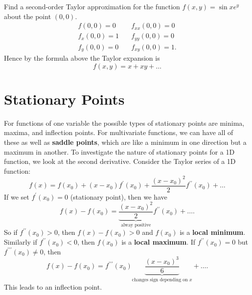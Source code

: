 \documentclass[../multivariate_calculus.tex]{subfiles}
\begin{document}
        \begin{example}
            Find a second-order Taylor approximation for the function $f(x,y)=\sin xe^y$ about the point $(0,0)$.
            \begin{align}
                f(0,0)=0&\quad f_{xx}(0,0)=0\\
                f_x(0,0)=1&\quad f_{yy}(0,0)=0\\
                f_y(0,0)=0&\quad f_{xy}(0,0)=1.
            \end{align}
            Hence by the formula above the Taylor expansion is
            \begin{equation}
                f(x,y)=x+xy+\dots
            \end{equation}
        \end{example}

    \section{Stationary Points}
        \paragraph{}
        For functions of one variable the possible types of stationary points are minima, maxima, and inflection points.
        For multivariate functions, we can have all of these as well as \textbf{saddle points}, which are like a minimum in one direction but a maximum in another.
        To investigate the nature of stationary points for a 1D function, we look at the second derivative.
        Consider the Taylor series of a 1D function:
        \begin{equation}
            f(x)=f(x_0)+(x-x_0)f^\prime(x_0)+\frac{(x-x_0)^2}{2}f^{\prime\prime}(x_0)+\dots
        \end{equation}
        If we set $f^\prime(x_0)=0$ (stationary point), then we have
        \begin{equation}
            f(x)-f(x_0)=\underbrace{\frac{(x-x_0)^2}{2}}_\text{alway positive}f^{\prime\prime}(x_0)+\dots.
        \end{equation}
        So if $f^{\prime\prime}(x_0)>0$, then $f(x)-f(x_0)>0$ and $f(x_0)$ is a \textbf{local minimum}.
        Similarly if $f^{\prime\prime}(x_0)<0$, then $f(x_0)$ is a \textbf{local maximum}.
        If $f^{\prime\prime}(x_0)=0$ but $f^{\prime\prime\prime}(x_0)\neq0$, then
        \begin{equation}
            f(x)-f(x_0)=f^{\prime\prime\prime}(x_0)\underbrace{\frac{(x-x_0)^3}{6}}_\text{changes sign depending on $x$}+\dots.
        \end{equation}
        This leads to an inflection point.
\end{document}
